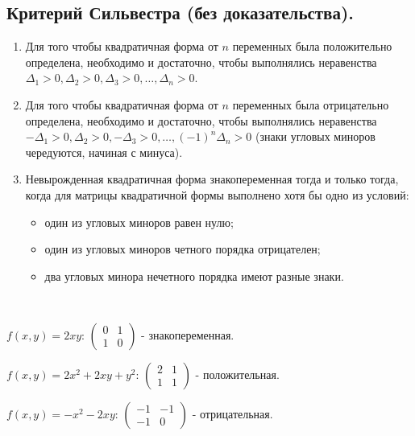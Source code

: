 \subsection{
    Критерий Сильвестра (без доказательства).
}

\begin{enumerate}
    \item Для того чтобы квадратичная форма от $n$ переменных была положительно определена, необходимо и достаточно, чтобы выполнялись неравенства $\Delta_1 > 0, \Delta_2 > 0, \Delta_3 > 0, \ldots, \Delta_n > 0$.
    \item Для того чтобы квадратичная форма от $n$ переменных была отрицательно определена, необходимо и достаточно, чтобы выполнялись неравенства $-\Delta_1 > 0, \Delta_2 > 0, -\Delta_3 > 0, \ldots, (-1)^n\Delta_n > 0$ (знаки угловых миноров чередуются, начиная с минуса).
    \item Невырожденная квадратичная форма знакопеременная тогда и только тогда, когда для матрицы квадратичной формы выполнено хотя бы одно из условий:
    \begin{itemize}
        \item один из угловых миноров равен нулю;
        \item один из угловых миноров четного порядка отрицателен;
        \item два угловых минора нечетного порядка имеют разные знаки.
    \end{itemize}
\end{enumerate}

\begin{example}~

    $f(x, y) = 2xy$: $\left(\begin{array}{cc}
        0 & 1 \\
        1 & 0
    \end{array}\right)$ - знакопеременная.

    $f(x, y) = 2x^2 + 2xy + y^2$: $\left(\begin{array}{cc}
        2 & 1 \\
        1 & 1
    \end{array}\right)$ - положительная.

    $f(x, y) = -x^2 - 2xy$: $\left(\begin{array}{cc}
        -1 & -1 \\
        -1 & 0
    \end{array}\right)$ - отрицательная.
\end{example}
